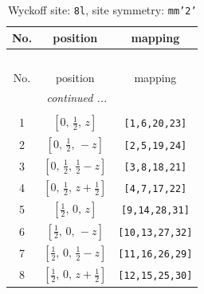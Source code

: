 \documentclass[fleqn,8pt]{jsarticle}
\begin{document}
\begin{longtable}{ccc}
\caption{Wyckoff site: {\tt 8l}, site symmetry: {\tt mm'2'}}
 \\
 \hline \hline
No. & position & mapping \\ \hline \endfirsthead

\multicolumn{2}{l}{\tablename\ \thetable{}} \\
 \hline \hline
No. & position & mapping \\ \hline \endhead

 \hline \hline
\multicolumn{2}{r}{\footnotesize\it continued ...} \\ \endfoot

 \hline \hline
\multicolumn{2}{r}{} \\ \endlastfoot

1 & $\left[ 0,\, \frac{1}{2},\, z \right]$ & {\tt [1,6,20,23]} \\ \hline
2 & $\left[ 0,\, \frac{1}{2},\, - z \right]$ & {\tt [2,5,19,24]} \\ \hline
3 & $\left[ 0,\, \frac{1}{2},\, \frac{1}{2} - z \right]$ & {\tt [3,8,18,21]} \\ \hline
4 & $\left[ 0,\, \frac{1}{2},\, z + \frac{1}{2} \right]$ & {\tt [4,7,17,22]} \\ \hline
5 & $\left[ \frac{1}{2},\, 0,\, z \right]$ & {\tt [9,14,28,31]} \\ \hline
6 & $\left[ \frac{1}{2},\, 0,\, - z \right]$ & {\tt [10,13,27,32]} \\ \hline
7 & $\left[ \frac{1}{2},\, 0,\, \frac{1}{2} - z \right]$ & {\tt [11,16,26,29]} \\ \hline
8 & $\left[ \frac{1}{2},\, 0,\, z + \frac{1}{2} \right]$ & {\tt [12,15,25,30]} \\
\end{longtable}
\renewcommand{\arraystretch}{1.2}
\end{document}
